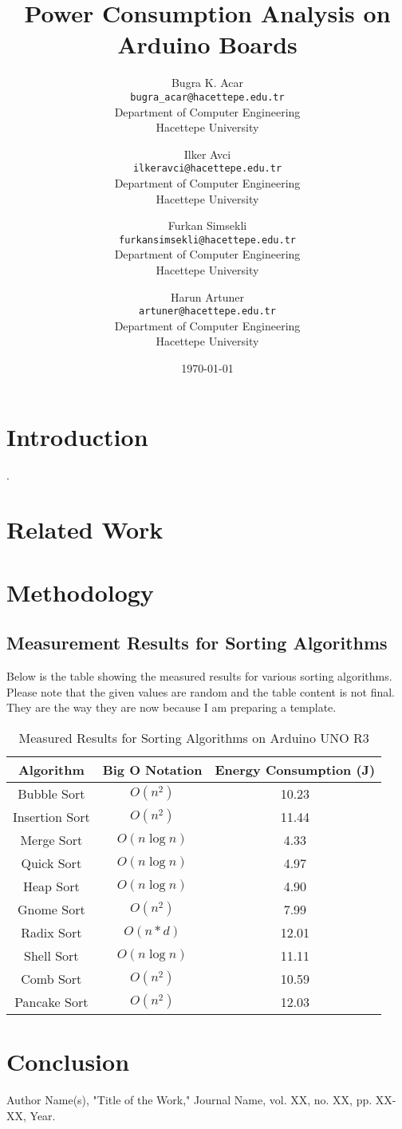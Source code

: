 \documentclass[12pt]{article}
\title{Power Consumption Analysis on Arduino Boards}
\author{
    Bugra K. Acar \\ 
    \small \texttt{bugra\_acar@hacettepe.edu.tr} \\ 
    \small Department of Computer Engineering \\ 
    \small Hacettepe University \\
    \and
    Ilker Avci \\ 
    \small \texttt{ilkeravci@hacettepe.edu.tr} \\ 
    \small Department of Computer Engineering \\ 
    \small Hacettepe University \\
    \and
    Furkan Simsekli \\ 
    \small \texttt{furkansimsekli@hacettepe.edu.tr} \\ 
    \small \small Department of Computer Engineering \\ 
    \small Hacettepe University \\
    \and
    Harun Artuner \\ 
    \small \texttt{artuner@hacettepe.edu.tr} \\ 
    \small Department of Computer Engineering \\ 
    \small Hacettepe University \\
}
\date{\today}
\begin{document}
\maketitle

\begin{abstract}
\lipsum[1]
\end{abstract}

\section{Introduction}
\lipsum[2]\cite{example_reference}.


\section{Related Work}
\lipsum[3]

\section{Methodology}
\lipsum[4]

\subsection{Measurement Results for Sorting Algorithms}
Below is the table showing the measured results for various sorting algorithms. Please note that the given values are random and the table content is not final. They are the way they are now because I am preparing a template.

\begin{table}[h!]
\centering
\begin{tabular}{|c|c|c|}
\hline
\textbf{Algorithm} & \textbf{Big O Notation} & \textbf{Energy Consumption (J)} \\ \hline
Bubble Sort & $O(n^2)$ & 10.23 \\ \hline
Insertion Sort & $O(n^2)$ & 11.44 \\ \hline
Merge Sort & $O(n \log n)$ & 4.33 \\ \hline
Quick Sort & $O(n \log n)$ & 4.97 \\ \hline
Heap Sort & $O(n \log n)$ & 4.90 \\ \hline
Gnome Sort & $O(n^2)$ & 7.99 \\ \hline
Radix Sort & $O(n*d)$ &  12.01 \\ \hline
Shell Sort & $O(n \log n)$ & 11.11 \\ \hline
Comb Sort & $O(n^2)$ & 10.59 \\ \hline
Pancake Sort & $O(n^2)$ & 12.03 \\ \hline
\end{tabular}
\caption{Measured Results for Sorting Algorithms on Arduino UNO R3}
\end{table}

\section{Conclusion}
\lipsum[5]

\begin{thebibliography}{99}

Author Name(s), "Title of the Work," Journal Name, vol. XX, no. XX, pp. XX-XX, Year.

\end{thebibliography}
\end{document}

